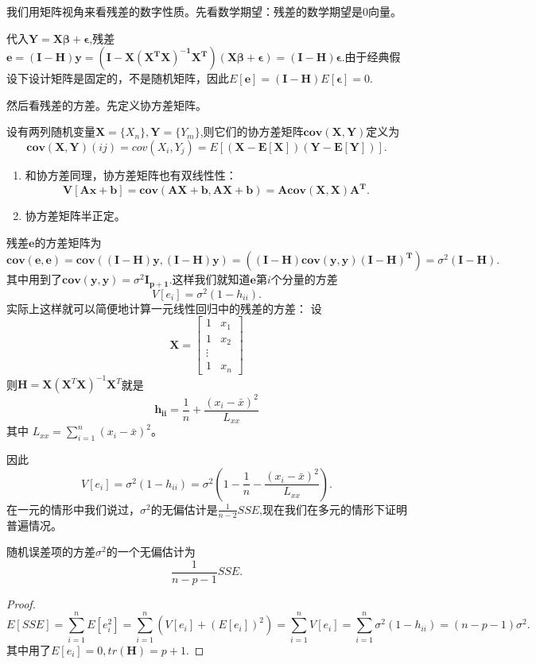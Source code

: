 \documentclass[lang=cn,10pt]{elegantbook}
\begin{document}
    我们用矩阵视角来看残差的数字性质。先看数学期望：残差的数学期望是0向量。
    
    代入\(\mathbf{Y}=\mathbf{X\beta+\epsilon}\),残差\(\mathbf{e}=\mathbf{(I-H)y}=(\mathbf{I-\mathbf{X}(\mathbf{X}^T\mathbf{X})^{-1}\mathbf{X}^T})(\mathbf{X\beta+\epsilon})=\mathbf{(I-H)\epsilon}.\)由于经典假设下设计矩阵是固定的，不是随机矩阵，因此\(E[\mathbf{e}]=\mathbf{(I-H)}E[\mathbf{\epsilon}]=0.\)
    
    然后看残差的方差。先定义协方差矩阵。
    \begin{definition}[协方差矩阵]
        设有两列随机变量\(\mathbf{X}=\{X_n\},\mathbf{Y}=\{Y_m\}\),则它们的协方差矩阵\(\mathbf{cov(X,Y)}\)定义为\[\mathbf{cov(X,Y)}(ij)=cov(X_i,Y_j)=E[(\mathbf{X-E[X]})(\mathbf{Y-E[Y]})].\]
    \end{definition}
    \begin{property}
        \begin{enumerate}
            \item 和协方差同理，协方差矩阵也有双线性性：\[\mathbf{V[Ax+b]}=\mathbf{cov(AX+b,AX+b)}=\mathbf{Acov(X,X)A^T}.\]
            \item 协方差矩阵半正定。
        \end{enumerate}
    \end{property}
    残差\(\mathbf{e}\)的方差矩阵为
    \[\mathbf{cov(e,e)}=\mathbf{cov((I-H)y,(I-H)y)}=(\mathbf{(I-H)cov(y,y)(I-H)^T})=\sigma^2(\mathbf{I-H}).\]
    其中用到了\(\mathbf{cov(y,y)}=\sigma^2\mathbf{I_{p+1}}\).这样我们就知道\(\mathbf{e}\)第\(i\)个分量的方差
    \[V[e_i]=\sigma^2(1-h_{ii}).\]
    实际上这样就可以简便地计算一元线性回归中的残差的方差：
    设\[
    \mathbf{X}=
    \begin{bmatrix}
        1 & x_1\\
        1 & x_2\\
        \vdots\\
        1 & x_n    
    \end{bmatrix}
    \]
    则\(\mathbf{H}=\mathbf{X}(\mathbf{X}^T\mathbf{X})^{-1}\mathbf{X}^T\)就是
    $$ \mathbf{h_{ii}} = \frac{1}{n} + \frac{(x_i - \bar{x})^2}{L_{xx}} $$
    其中 $L_{xx} = \sum_{i=1}^n (x_i - \bar{x})^2$。

    因此\[V[e_i]=\sigma^2(1-h_{ii})=\sigma^2(1-\frac{1}{n} - \frac{(x_i - \bar{x})^2}{L_{xx}}).\]
    在一元的情形中我们说过，\(\sigma^2\)的无偏估计是\(\frac{1}{n-2}SSE\),现在我们在多元的情形下证明普遍情况。
    \begin{theorem}[方差的无偏估计]
        随机误差项的方差\(\sigma^2\)的一个无偏估计为
        \[\frac{1}{n-p-1}SSE.\]
    \end{theorem}
    \begin{proof}
        \[E[SSE]=\sum_{i=1}^{n}E[e_i^2]=\sum_{i=1}^{n}(V[e_i]+(E[e_i])^2)=\sum_{i=1}^{n}V[e_i]=\sum_{i=1}^{n}\sigma^2(1-h_{ii})=(n-p-1)\sigma^2.\]
        其中用了\(E[e_i]=0,tr(\mathbf{H})=p+1.\)
    \end{proof}
\end{document}
